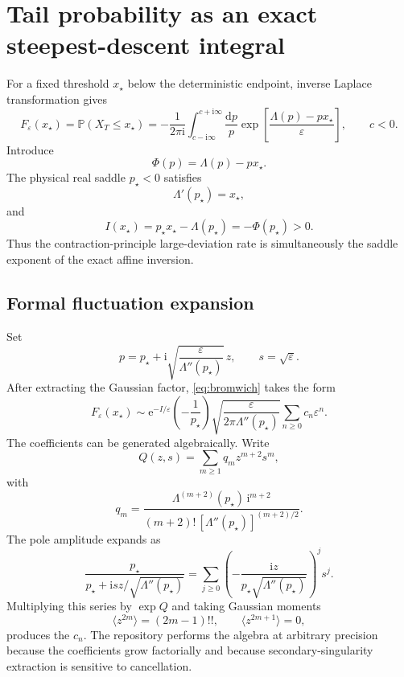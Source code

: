 \documentclass[11pt]{article}
\newcommand{\Pp}{\mathbb P}
\newcommand{\dd}{\mathrm d}
\newcommand{\e}{\mathrm e}
\newcommand{\ii}{\mathrm i}
\newcommand{\PhiH}{\Phi}
\begin{document}
\section{Tail probability as an exact steepest-descent integral}
For a fixed threshold $x_\star$ below the deterministic endpoint, inverse Laplace transformation gives
\begin{equation}
 F_\varepsilon(x_\star)
 =\Pp(X_T\le x_\star)
 =-\frac{1}{2\pi\ii}\int_{c-\ii\infty}^{c+\ii\infty}
 \frac{\dd p}{p}
 \exp\left[\frac{\Lambda(p)-px_\star}{\varepsilon}\right],
 \qquad c<0.
 \label{eq:bromwich}
\end{equation}
Introduce
\begin{equation}
 \PhiH(p)=\Lambda(p)-px_\star.
\end{equation}
The physical real saddle $p_\star<0$ satisfies
\begin{equation}
 \Lambda'(p_\star)=x_\star,
 \label{eq:saddleeq}
\end{equation}
and
\begin{equation}
 I(x_\star)=p_\star x_\star-\Lambda(p_\star)=-\PhiH(p_\star)>0.
 \label{eq:rate}
\end{equation}
Thus the contraction-principle large-deviation rate is simultaneously the saddle exponent of the exact affine inversion.

\subsection{Formal fluctuation expansion}
Set
\begin{equation}
 p=p_\star+\ii\sqrt{\frac{\varepsilon}{\Lambda''(p_\star)}}\,z,
 \qquad s=\sqrt\varepsilon.
\end{equation}
After extracting the Gaussian factor, \eqref{eq:bromwich} takes the form
\begin{equation}
 F_\varepsilon(x_\star)
 \sim \e^{-I/\varepsilon}
 \left(-\frac{1}{p_\star}\right)
 \sqrt{\frac{\varepsilon}{2\pi\Lambda''(p_\star)}}
 \sum_{n\ge0}c_n\varepsilon^n.
 \label{eq:hestonsaddleexp}
\end{equation}
The coefficients can be generated algebraically. Write
\begin{equation}
 Q(z,s)=\sum_{m\ge1}q_m z^{m+2}s^m,
\end{equation}
with
\begin{equation}
 q_m=
 \frac{\Lambda^{(m+2)}(p_\star)\,\ii^{m+2}}
 {(m+2)!\,[\Lambda''(p_\star)]^{(m+2)/2}}.
\end{equation}
The pole amplitude expands as
\begin{equation}
 \frac{p_\star}{p_\star+\ii s z/\sqrt{\Lambda''(p_\star)}}
 =\sum_{j\ge0}
 \left(-\frac{\ii z}{p_\star\sqrt{\Lambda''(p_\star)}}\right)^j s^j.
\end{equation}
Multiplying this series by $\exp Q$ and taking Gaussian moments
\begin{equation}
 \langle z^{2m}\rangle=(2m-1)!!,
 \qquad
 \langle z^{2m+1}\rangle=0,
\end{equation}
produces the $c_n$. The repository performs the algebra at arbitrary precision because the coefficients grow factorially and because secondary-singularity extraction is sensitive to cancellation.
\end{document}
